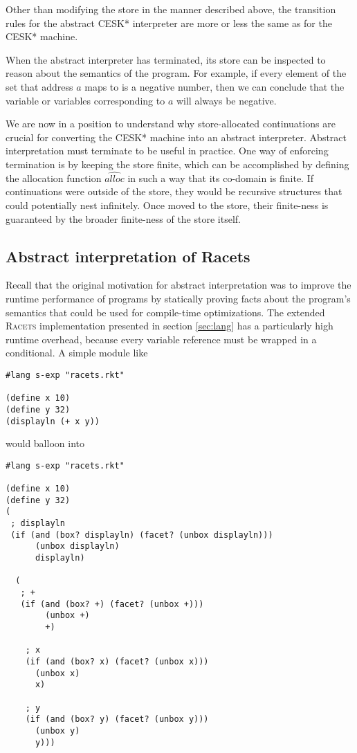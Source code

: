 \documentclass{article}
\begin{document}
Other than modifying the store in the manner described above, the transition rules for the abstract CESK* interpreter are more or less the same as for the CESK* machine.

When the abstract interpreter has terminated, its store can be inspected to reason about the semantics of the program. For example, if every element of the set that address $a$ maps to is a negative number, then we can conclude that the variable or variables corresponding to $a$ will always be negative.

We are now in a position to understand why store-allocated continuations are crucial for converting the CESK* machine into an abstract interpreter. Abstract interpretation must terminate to be useful in practice. One way of enforcing termination is by keeping the store finite, which can be accomplished by defining the allocation function $\widehat{alloc}$ in such a way that its co-domain is finite. If continuations were outside of the store, they would be recursive structures that could potentially nest infinitely. Once moved to the store, their finite-ness is guaranteed by the broader finite-ness of the store itself.


\subsection{Abstract interpretation of Racets}
Recall that the original motivation for abstract interpretation was to improve the runtime performance of programs by statically proving facts about the program's semantics that could be used for compile-time optimizations. The extended \textsc{Racets} implementation presented in section \ref{sec:lang} has a particularly high runtime overhead, because every variable reference must be wrapped in a conditional. A simple module like

\begin{lstlisting}
#lang s-exp "racets.rkt"

(define x 10)
(define y 32)
(displayln (+ x y))
\end{lstlisting}

\noindent would balloon into

\begin{lstlisting}
#lang s-exp "racets.rkt"

(define x 10)
(define y 32)
(
 ; displayln
 (if (and (box? displayln) (facet? (unbox displayln)))
      (unbox displayln)
      displayln)

  (
   ; +
   (if (and (box? +) (facet? (unbox +)))
        (unbox +)
        +)

    ; x
    (if (and (box? x) (facet? (unbox x)))
      (unbox x)
      x)

    ; y
    (if (and (box? y) (facet? (unbox y)))
      (unbox y)
      y)))
\end{lstlisting}
\end{document}
